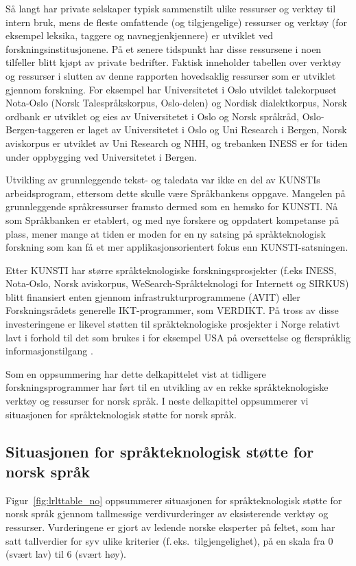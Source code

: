 \begin{multicols}{2}
Så langt har private selskaper typisk sammenstilt ulike ressurser og verktøy til intern bruk, mens de fleste omfattende (og tilgjengelige) ressurser og verktøy (for eksempel leksika, taggere og navnegjenkjennere) er utviklet ved forskningsinstitusjonene. På et senere tidspunkt har disse ressursene i noen tilfeller blitt kjøpt av private bedrifter. Faktisk inneholder tabellen over verktøy og ressurser i slutten av denne rapporten hovedsaklig ressurser som er utviklet gjennom forskning. For eksempel har Universitetet i Oslo utviklet talekorpuset Nota-Oslo (Norsk Talespråkskorpus, Oslo-delen) og Nordisk dialektkorpus, Norsk ordbank er utviklet og eies av Universitetet i Oslo og Norsk språkråd, Oslo-Bergen-taggeren er laget av Universitetet i Oslo og Uni Research i Bergen, Norsk aviskorpus er utviklet av Uni Research og NHH, og trebanken INESS er for tiden under oppbygging ved Universitetet i Bergen.

Utvikling av grunnleggende tekst- og taledata var ikke en del av KUNSTIs arbeidsprogram, ettersom dette skulle være Språkbankens oppgave. Mangelen på grunnleggende språkressurser framsto dermed som en hemsko for KUNSTI. Nå som Språkbanken er etablert, og med nye forskere og oppdatert kompetanse på plass, mener mange at tiden er moden for en ny satsing på språkteknologisk forskning som kan få et mer applikasjonsorientert fokus enn KUNSTI-satsningen.

Etter KUNSTI har større språkteknologiske forskningsprosjekter (f.eks INESS, Nota-Oslo, Norsk aviskorpus, WeSearch-Språkteknologi for Internett og SIRKUS) blitt finansiert enten gjennom infrastrukturprogrammene (AVIT) eller Forskningsrådets generelle IKT-programmer, som VERDIKT. 
På tross av disse investeringene er likevel støtten til språkteknologiske prosjekter i Norge relativt lavt i forhold til det som brukes i for eksempel USA på oversettelse og flerspråklig informasjonstilgang \cite{laz1}.

Som en oppsummering har dette delkapittelet vist at tidligere forskningsprogrammer har ført til en utvikling av en rekke språkteknologiske verktøy og ressurser for norsk språk. 
I neste delkapittel oppsummerer vi situasjonen for språkteknologisk støtte for norsk språk. 
  
\subsection{Situasjonen for språkteknologisk støtte for norsk språk}
Figur~\ref{fig:lrlttable_no} oppsummerer situasjonen for språkteknologisk støtte for norsk språk gjennom tallmessige verdivurderinger av eksisterende verktøy og ressurser. Vurderingene er gjort av ledende norske eksperter på feltet, som har satt tallverdier for syv ulike kriterier (f.\,eks.~tilgjengelighet), på en skala fra 0 (svært lav) til 6 (svært høy).


\end{multicols}
